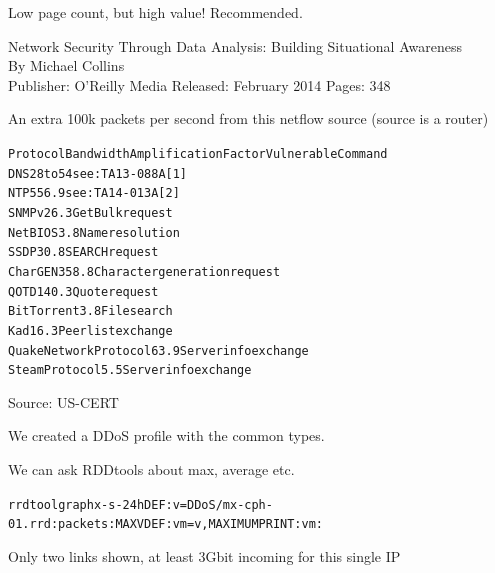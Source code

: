 \documentclass[20pt,landscape,a4paper,footrule]{foils}
\begin{document}


Low page count, but high value! Recommended.

Network Security Through Data Analysis: Building Situational Awareness\\
By Michael Collins\\
Publisher: O'Reilly Media
Released: February 2014 Pages: 348






\centerline{An extra 100k packets per second from this netflow source (source is a router)}



\begin{alltt}\small
Protocol   Bandwidth Amplification Factor        Vulnerable Command
DNS        28 to 54          see: TA13-088A [1]
NTP        556.9             see: TA14-013A [2]
SNMPv2       6.3             GetBulk request
NetBIOS      3.8             Name resolution
SSDP        30.8             SEARCH request
CharGEN    358.8             Character generation request
QOTD       140.3             Quote request
BitTorrent   3.8             File search
Kad         16.3             Peer list exchange
Quake Network Protocol 63.9  Server info exchange
Steam Protocol  5.5          Server info exchange
\end{alltt}

Source: US-CERT\\




We created a DDoS profile with the common types.

We can ask RDDtools about max, average etc.
\begin{alltt}\small
rrdtool graph x -s -24h DEF:v=DDoS/mx-cph-01.rrd:packets:MAX VDEF:vm=v,MAXIMUM PRINT:vm:%
\end{alltt}





\centerline{Only two links shown, at least 3Gbit incoming for this single IP}
\end{document}
